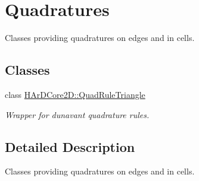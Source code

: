 \hypertarget{group__Quadratures}{}\section{Quadratures}
\label{group__Quadratures}


Classes providing quadratures on edges and in cells.  


\subsection*{Classes}
\begin{DoxyCompactItemize}
\item 
class \hyperlink{classHArDCore2D_1_1QuadRuleTriangle}{H\+Ar\+D\+Core2\+D\+::\+Quad\+Rule\+Triangle}
\begin{DoxyCompactList}\small\item\em Wrapper for dunavant quadrature rules. \end{DoxyCompactList}\end{DoxyCompactItemize}


\subsection{Detailed Description}
Classes providing quadratures on edges and in cells. 

